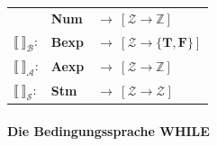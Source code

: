 \documentclass[
  a4paper,
  11pt,
]{scrartcl}
\newcommand{\Z}{\mathbb{Z}}
\newcommand{\Ac}{\mathcal{A}}
\newcommand{\Bc}{\mathcal{B}}
\newcommand{\Sc}{\mathcal{S}}
\newcommand{\Zc}{\mathcal{Z}}
\begin{document}
\begin{itemize}
\begin{center}
\begin{tabular}{lll}
        & \textbf{Num}
        & $\rightarrow \ \left[ \Zc \rightarrow \Z \right]$\\
        $\llbracket \ \rrbracket_{\Bc}$:
        & \textbf{Bexp}
        & $\rightarrow \ \left[ \Zc \rightarrow \{ \textbf{T}, \textbf{F} \} \right]$\\
        $\llbracket \ \rrbracket_{\Ac}$:
        & \textbf{Aexp}
        & $\rightarrow \ \left[ \Zc \rightarrow \Z \right]$\\
        $\llbracket \ \rrbracket_{\Sc}$:
        & \textbf{Stm}
        & $\rightarrow \ \left[ \Zc \rightarrow \Zc \right]$\\
      \end{tabular}
    \end{center}
\end{itemize}

\paragraph{Die Bedingungssprache WHILE}
\label{par:die_bedingungssprache_while}
\end{document}
